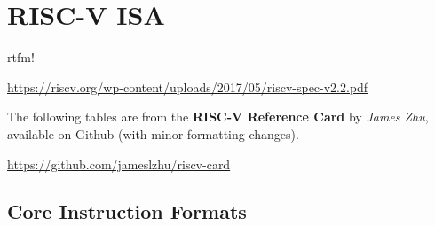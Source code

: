 \section{RISC-V ISA}
rtfm!

\url{https://riscv.org/wp-content/uploads/2017/05/riscv-spec-v2.2.pdf}

\newpar{}

The following tables are from the \textbf{RISC-V Reference Card} by \textit{James Zhu}, available on Github (with minor formatting changes).

\url{https://github.com/jameslzhu/riscv-card}



\subsection{Core Instruction Formats}
\small
